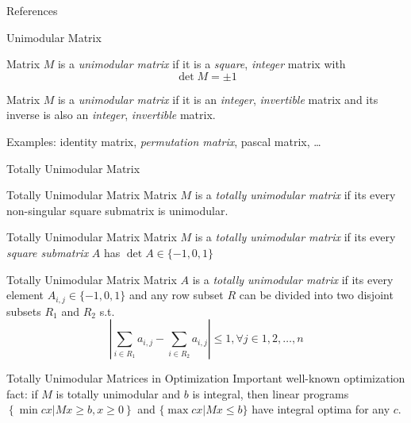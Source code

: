 \documentclass[presentation,professionalfonts]{beamer}
\begin{document}
\begin{frame}[fragile]{References}
\printbibliography
\end{frame}

\appendix

\begin{frame}{Unimodular Matrix}
  \begin{definition}
    Matrix \(M\) is a \emph{unimodular matrix} if it is a \emph{square}, \emph{integer} matrix with \[\det M = \pm 1\]
  \end{definition}
  \begin{definition}
    Matrix \(M\) is a \emph{unimodular matrix} if it is an
    \emph{integer}, \emph{invertible} matrix and its inverse is also
    an \emph{integer}, \emph{invertible} matrix.
  \end{definition}
  Examples: identity matrix, \emph{permutation matrix}, pascal matrix, \dots
\end{frame}

\begin{frame}{Totally Unimodular Matrix}
  \begin{definition}{Totally Unimodular Matrix}
    Matrix \(M\) is a \emph{totally unimodular matrix} if its every
    non-singular square submatrix is unimodular.
  \end{definition}

  \begin{definition}{Totally Unimodular Matrix}
    Matrix \(M\) is a \emph{totally unimodular matrix} if its every
    \emph{square submatrix} \(A\) has \(\det A\in \{-1, 0, 1\}\)
  \end{definition}

  \begin{definition}{Totally Unimodular Matrix}
    Matrix \(A\) is a \emph{totally unimodular matrix} if its every
    element \(A_{i, j}\in \{-1, 0, 1\}\) and any row subset \(R\) can
    be divided into two disjoint subsets \(R_1\) and \(R_2\) s.t.
    \[\left|\sum_{i\in R_1} a_{i, j} - \sum_{i\in R_2}a_{i, j}\right| \leq 1, \forall j\in{1, 2, \dots, n}\]
    \end{definition}
\end{frame}

\begin{frame}{Totally Unimodular Matrices in Optimization}
  Important well-known optimization fact: if \(M\) is totally
  unimodular and \(b\) is integral, then linear programs \(\left\{\min
  cx | Mx \geq b, x\geq 0\right\}\) and \(\{\max cx | Mx \leq b\}\)
  have integral optima for any \(c\).
\end{frame}
\end{document}
